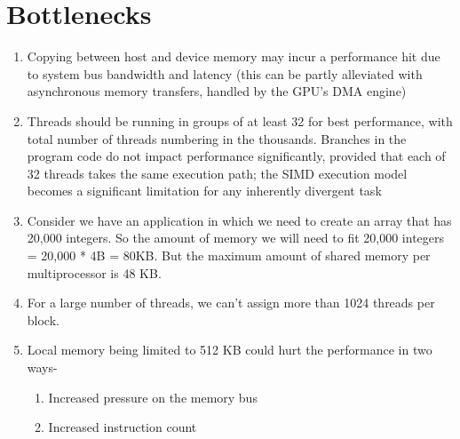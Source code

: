 \chapter{Bottlenecks}
\begin{enumerate}
\item Copying between host and device memory may incur a performance hit due to system bus bandwidth and latency (this can be partly alleviated with asynchronous memory transfers, handled by the GPU's DMA engine)
\item Threads should be running in groups of at least 32 for best performance, with total number of threads numbering in the thousands. Branches in the program code do not impact performance significantly, provided that each of 32 threads takes the same execution path; the SIMD execution model becomes a significant limitation for any inherently divergent task 
\item Consider we have an application in which we need to create an array that has 20,000 integers. So the amount of memory we will need to fit 20,000 integers = 20,000 * 4B = 80KB. But the maximum amount of shared memory per multiprocessor is 48 KB.
\item For a large number of threads, we can't assign more than 1024 threads per block.
\item Local memory being limited to 512 KB could hurt the performance in two ways-
\begin{enumerate}
\item Increased pressure on the memory bus
\item Increased instruction count
\end{enumerate}
\end{enumerate}

